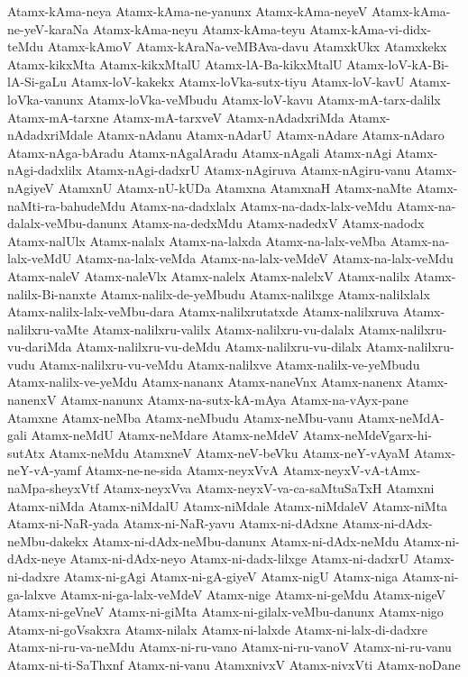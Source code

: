 {Atamx-kAma-neya
Atamx-kAma-ne-yanunx
Atamx-kAma-neyeV
Atamx-kAma-ne-yeV-karaNa
Atamx-kAma-neyu
Atamx-kAma-teyu
Atamx-kAma-vi-didx-teMdu
Atamx-kAmoV
Atamx-kAraNa-veMBAva-davu
AtamxkUkx
Atamxkekx
Atamx-kikxMta
Atamx-kikxMtalU
Atamx-lA-Ba-kikxMtalU
Atamx-loV-kA-Bi-lA-Si-gaLu
Atamx-loV-kakekx
Atamx-loVka-sutx-tiyu
Atamx-loV-kavU
Atamx-loVka-vanunx
Atamx-loVka-veMbudu
Atamx-loV-kavu
Atamx-mA-tarx-dalilx
Atamx-mA-tarxne
Atamx-mA-tarxveV
Atamx-nAdadxriMda
Atamx-nAdadxriMdale
Atamx-nAdanu
Atamx-nAdarU
Atamx-nAdare
Atamx-nAdaro
Atamx-nAga-bAradu
Atamx-nAgalAradu
Atamx-nAgali
Atamx-nAgi
Atamx-nAgi-dadxlilx
Atamx-nAgi-dadxrU
Atamx-nAgiruva
Atamx-nAgiru-vanu
Atamx-nAgiyeV
AtamxnU
Atamx-nU-kUDa
Atamxna
AtamxnaH
Atamx-naMte
Atamx-naMti-ra-bahudeMdu
Atamx-na-dadxlalx
Atamx-na-dadx-lalx-veMdu
Atamx-na-dalalx-veMbu-danunx
Atamx-na-dedxMdu
Atamx-nadedxV
Atamx-nadodx
Atamx-nalUlx
Atamx-nalalx
Atamx-na-lalxda
Atamx-na-lalx-veMba
Atamx-na-lalx-veMdU
Atamx-na-lalx-veMda
Atamx-na-lalx-veMdeV
Atamx-na-lalx-veMdu
Atamx-naleV
Atamx-naleVlx
Atamx-nalelx
Atamx-nalelxV
Atamx-nalilx
Atamx-nalilx-Bi-nanxte
Atamx-nalilx-de-yeMbudu
Atamx-nalilxge
Atamx-nalilxlalx
Atamx-nalilx-lalx-veMbu-dara
Atamx-nalilxrutatxde
Atamx-nalilxruva
Atamx-nalilxru-vaMte
Atamx-nalilxru-valilx
Atamx-nalilxru-vu-dalalx
Atamx-nalilxru-vu-dariMda
Atamx-nalilxru-vu-deMdu
Atamx-nalilxru-vu-dilalx
Atamx-nalilxru-vudu
Atamx-nalilxru-vu-veMdu
Atamx-nalilxve
Atamx-nalilx-ve-yeMbudu
Atamx-nalilx-ve-yeMdu
Atamx-nananx
Atamx-naneVnx
Atamx-nanenx
Atamx-nanenxV
Atamx-nanunx
Atamx-na-sutx-kA-mAya
Atamx-na-vAyx-pane
Atamxne
Atamx-neMba
Atamx-neMbudu
Atamx-neMbu-vanu
Atamx-neMdA-gali
Atamx-neMdU
Atamx-neMdare
Atamx-neMdeV
Atamx-neMdeVgarx-hi-sutAtx
Atamx-neMdu
AtamxneV
Atamx-neV-beVku
Atamx-neY-vAyaM
Atamx-neY-vA-yamf
Atamx-ne-ne-sida
Atamx-neyxVvA
Atamx-neyxV-vA-tAmx-naMpa-sheyxVtf
Atamx-neyxVva
Atamx-neyxV-va-ca-saMtuSaTxH
Atamxni
Atamx-niMda
Atamx-niMdalU
Atamx-niMdale
Atamx-niMdaleV
Atamx-niMta
Atamx-ni-NaR-yada
Atamx-ni-NaR-yavu
Atamx-ni-dAdxne
Atamx-ni-dAdx-neMbu-dakekx
Atamx-ni-dAdx-neMbu-danunx
Atamx-ni-dAdx-neMdu
Atamx-ni-dAdx-neye
Atamx-ni-dAdx-neyo
Atamx-ni-dadx-lilxge
Atamx-ni-dadxrU
Atamx-ni-dadxre
Atamx-ni-gAgi
Atamx-ni-gA-giyeV
Atamx-nigU
Atamx-niga
Atamx-ni-ga-lalxve
Atamx-ni-ga-lalx-veMdeV
Atamx-nige
Atamx-ni-geMdu
Atamx-nigeV
Atamx-ni-geVneV
Atamx-ni-giMta
Atamx-ni-gilalx-veMbu-danunx
Atamx-nigo
Atamx-ni-goVsakxra
Atamx-nilalx
Atamx-ni-lalxde
Atamx-ni-lalx-di-dadxre
Atamx-ni-ru-va-neMdu
Atamx-ni-ru-vano
Atamx-ni-ru-vanoV
Atamx-ni-ru-vanu
Atamx-ni-ti-SaThxnf
Atamx-ni-vanu
AtamxnivxV
Atamx-nivxVti
Atamx-noDane
}

